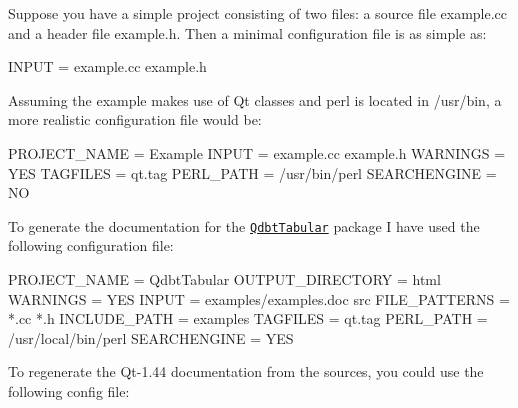 Suppose you have a simple project consisting of two files: a source file {\ttfamily example.cc} and a header file {\ttfamily example.h}. Then a minimal configuration file is as simple as: \begin{DoxyVerb}
INPUT            = example.cc example.h
\end{DoxyVerb}


Assuming the example makes use of Qt classes and perl is located in {\ttfamily /usr/bin}, a more realistic configuration file would be: \begin{DoxyVerb}
PROJECT_NAME     = Example
INPUT            = example.cc example.h
WARNINGS         = YES
TAGFILES         = qt.tag
PERL_PATH        = /usr/bin/perl
SEARCHENGINE     = NO
\end{DoxyVerb}


To generate the documentation for the \href{http://www.stack.nl/~dimitri/qdbttabular/index.html}{\tt QdbtTabular} package I have used the following configuration file: \begin{DoxyVerb}
PROJECT_NAME     = QdbtTabular
OUTPUT_DIRECTORY = html
WARNINGS         = YES
INPUT            = examples/examples.doc src
FILE_PATTERNS    = *.cc *.h
INCLUDE_PATH     = examples
TAGFILES         = qt.tag
PERL_PATH        = /usr/local/bin/perl
SEARCHENGINE     = YES
\end{DoxyVerb}


To regenerate the Qt-\/1.44 documentation from the sources, you could use the following config file: 


